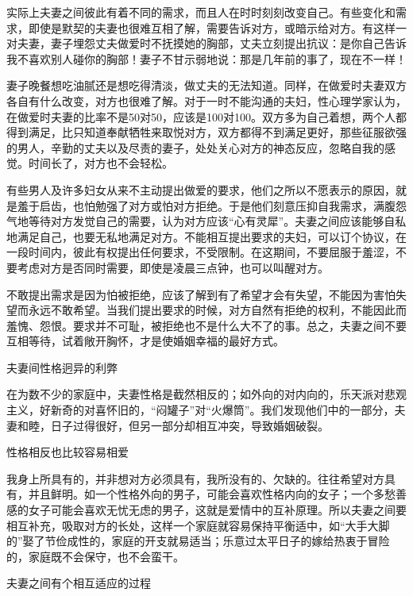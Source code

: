 \documentclass[12pt,UTF8,openany]{ctexbook}
\begin{document}
实际上夫妻之间彼此有着不同的需求，而且人在时时刻刻改变自己。有些变化和需求，即使是默契的夫妻也很难互相了解，需要告诉对方，或暗示给对方。有这样一对夫妻，妻子埋怨丈夫做爱时不抚摸她的胸部，丈夫立刻提出抗议：是你自己告诉我不喜欢别人碰你的胸部！妻子不甘示弱地说：那是几年前的事了，现在不一样！

妻子晚餐想吃油腻还是想吃得清淡，做丈夫的无法知道。同样，在做爱时夫妻双方各自有什么改变，对方也很难了解。对于一时不能沟通的夫妇，性心理学家认为，在做爱时夫妻的比率不是50对50，应该是100对100。双方多为自己着想，两个人都得到满足，比只知道奉献牺牲来取悦对方，双方都得不到满足更好，那些征服欲强的男人，辛勤的丈夫以及尽责的妻子，处处关心对方的神态反应，忽略自我的感觉。时间长了，对方也不会轻松。

有些男人及许多妇女从来不主动提出做爱的要求，他们之所以不愿表示的原因，就是羞于启齿，也怕勉强了对方或怕对方拒绝。于是他们刻意压抑自我需求，满腹怨气地等待对方发觉自己的需要，认为对方应该“心有灵犀”。夫妻之间应该能够自私地满足自己，也要无私地满足对方。不能相互提出要求的夫妇，可以订个协议，在一段时间内，彼此有权提出任何要求，不受限制。在这期间，不要屈服于羞涩，不要考虑对方是否同时需要，即使是凌晨三点钟，也可以叫醒对方。

不敢提出需求是因为怕被拒绝，应该了解到有了希望才会有失望，不能因为害怕失望而永远不敢希望。当我们提出要求的时候，对方自然有拒绝的权利，不能因此而羞愧、怨恨。要求并不可耻，被拒绝也不是什么大不了的事。总之，夫妻之间不要互相等待，试着敞开胸怀，才是使婚姻幸福的最好方式。





夫妻间性格迥异的利弊


在为数不少的家庭中，夫妻性格是截然相反的；如外向的对内向的，乐天派对悲观主义，好新奇的对喜怀旧的，“闷罐子”对“火爆筒”。我们发现他们中的一部分，夫妻和睦，日子过得很好，但另一部分却相互冲突，导致婚姻破裂。





性格相反也比较容易相爱


我身上所具有的，并非想对方必须具有，我所没有的、欠缺的。往往希望对方具有，并且鲜明。如一个性格外向的男子，可能会喜欢性格内向的女子；一个多愁善感的女子可能会喜欢无忧无虑的男子，这就是爱情中的互补原理。所以夫妻之间要相互补充，吸取对方的长处，这样一个家庭就容易保持平衡适中，如“大手大脚的”娶了节俭成性的，家庭的开支就易适当；乐意过太平日子的嫁给热衷于冒险的，家庭既不会保守，也不会蛮干。





夫妻之间有个相互适应的过程
\end{document}

